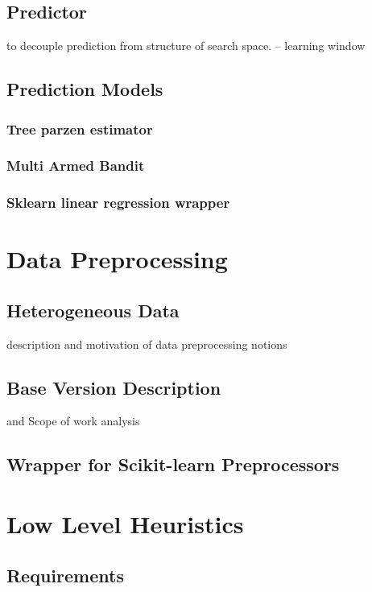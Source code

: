 \subsection{Predictor}
to decouple prediction from structure of search space.
-- learning window

\subsection{Prediction Models}\label{implementation: prediction models}
\subsubsection{Tree parzen estimator}
\subsubsection{Multi Armed Bandit}
\subsubsection{Sklearn linear regression wrapper}


\section{Data Preprocessing}
\subsection{Heterogeneous Data} description and motivation of data preprocessing notions

\subsection{Base Version Description} and Scope of work analysis
\subsection{Wrapper for Scikit-learn Preprocessors}


\section{Low Level Heuristics}\label{impl: LLH}

\subsection{Requirements}

